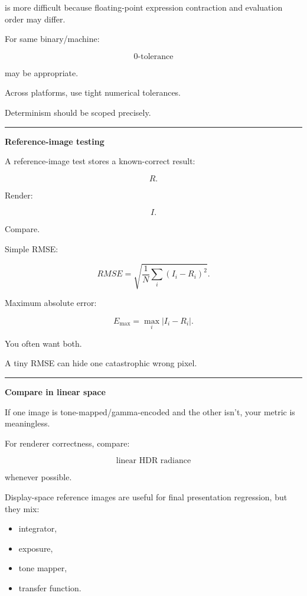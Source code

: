 is more difficult because floating-point expression contraction and evaluation order may differ.

For same binary/machine:

\[
0\text{-tolerance}
\]

may be appropriate.

Across platforms, use tight numerical tolerances.

Determinism should be scoped precisely.

\begin{center}\rule{0.5\linewidth}{0.5pt}\end{center}

\textbf{Reference-image testing}

A reference-image test stores a known-correct result:

\[
R.
\]

Render:

\[
I.
\]

Compare.

Simple RMSE:

\[
\boxed{
RMSE
=
\sqrt{
\frac1N
\sum_i
(I_i-R_i)^2
}.
}
\]

Maximum absolute error:

\[
\boxed{
E_{\max}
=
\max_i|I_i-R_i|.
}
\]

You often want both.

A tiny RMSE can hide one catastrophic wrong pixel.

\begin{center}\rule{0.5\linewidth}{0.5pt}\end{center}

\textbf{Compare in linear space}

If one image is tone-mapped/gamma-encoded and the other isn't, your metric is meaningless.

For renderer correctness, compare:

\[
\boxed{\text{linear HDR radiance}}
\]

whenever possible.

Display-space reference images are useful for final presentation regression, but they mix:

\begin{itemize}
\tightlist
\item
  integrator,
\item
  exposure,
\item
  tone mapper,
\item
  transfer function.
\end{itemize}


